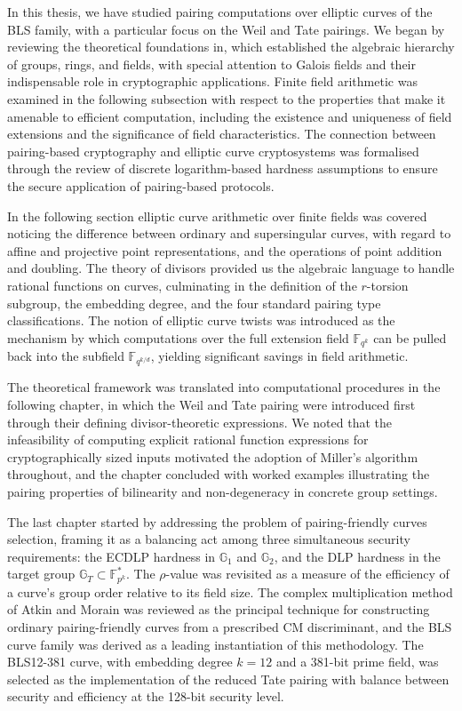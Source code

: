 In this thesis, we have studied pairing computations over elliptic curves of the BLS family, with a particular focus on the Weil and Tate pairings. We began by reviewing the theoretical foundations in, which established the algebraic hierarchy of groups, rings, and fields, with special attention to Galois fields and their indispensable role in cryptographic applications. Finite field arithmetic was examined in the following subsection with respect to the properties that make it amenable to efficient computation, including the existence and uniqueness
of field extensions and the significance of field characteristics. The connection between pairing-based cryptography and elliptic curve cryptosystems was formalised through the review of discrete logarithm-based hardness assumptions to ensure the secure application of pairing-based protocols. 

In the following section elliptic curve arithmetic over finite fields was covered noticing the difference between ordinary and supersingular curves, with regard to affine and projective point representations, and the operations of point addition and doubling. The theory of divisors provided us the algebraic language to handle rational
functions on curves, culminating in the definition of the $r$-torsion
subgroup, the embedding degree, and the four standard pairing type
classifications.  The notion of elliptic curve twists was introduced as the mechanism by which computations over the full extension field $\mathbb{F}_{q^k}$ can be pulled back into the subfield $\mathbb{F}_{q^{k/d}}$, yielding significant savings in field arithmetic.

The theoretical framework was translated into computational procedures in the following chapter,  in which the Weil and Tate pairing were introduced first through their defining divisor-theoretic expressions.  We noted that the infeasibility of computing explicit rational function expressions for cryptographically sized inputs motivated the adoption of Miller's algorithm throughout, and the chapter concluded with worked examples illustrating the pairing properties of bilinearity and non-degeneracy in concrete group settings.

The last chapter started by addressing the problem of pairing-friendly curves selection, framing
it as a balancing act among three simultaneous security requirements: the
ECDLP hardness in $\mathbb{G}_1$ and $\mathbb{G}_2$, and the DLP hardness
in the target group $\mathbb{G}_T \subset \mathbb{F}_{p^k}^*$. The
$\rho$-value was revisited as a measure of the efficiency of a curve's
group order relative to its field size. The complex multiplication method
of Atkin and Morain was reviewed as the principal technique for constructing
ordinary pairing-friendly curves from a prescribed CM discriminant, and the
BLS curve family was derived as a leading instantiation of this methodology.
The BLS12-381 curve, with embedding degree $k = 12$ and a 381-bit prime
field, was selected as the implementation of the reduced Tate pairing with
balance between security and efficiency at the 128-bit security level.